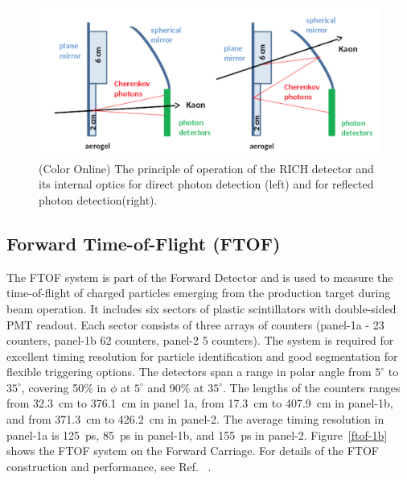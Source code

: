 \documentclass[final,3p,twocolumn]{elsarticle}
\begin{document}
\begin{figure}[htbp!]
\includegraphics[width=2.0\columnwidth]{rich.png}
\caption{(Color Online) The principle of operation of the
RICH detector and its internal optics for direct photon detection (left) and for reflected photon detection(right).}
\label{rich}
\end{figure}

\subsection{Forward Time-of-Flight (FTOF)}
\label{ftof}

The FTOF system is part of the Forward Detector and is used to measure the time-of-flight of charged particles 
emerging from the production target during beam operation. It includes six sectors of plastic scintillators with 
double-sided PMT readout. Each sector consists of three arrays of counters (panel-1a - 23 counters, panel-1b 62
counters, panel-2 5 counters). The system is required for excellent timing resolution for particle identification and
good segmentation for flexible triggering options. The detectors span a range in polar angle from $5^\circ$ to
$35^\circ$, covering 50\% in $\phi$ at $5^\circ$ and 90\% at $35^\circ$. The lengths of the counters ranges from
32.3~cm to 376.1~cm in panel 1a, from 17.3~cm to 407.9~cm in panel-1b, and from 371.3~cm to 426.2~cm in panel-2.
The average timing resolution in panel-1a is 125~ps, 85~ps in panel-1b, and 155~ps in panel-2. Figure~\ref{ftof-1b}
shows the FTOF system on the Forward Carriage. For details of the FTOF construction and performance, see
Ref. ~\cite{FTOF}. 
\end{document}
